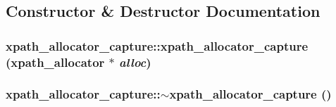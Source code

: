 \subsection{Constructor \& Destructor Documentation}
\hypertarget{structxpath__allocator__capture_af6925e08c811c0cbda74d4da5b9f2eed}{
\subsubsection[{xpath\_\-allocator\_\-capture}]{\setlength{\rightskip}{0pt plus 5cm}xpath\_\-allocator\_\-capture::xpath\_\-allocator\_\-capture ({\bf xpath\_\-allocator} $\ast$ {\em alloc})}}
\label{structxpath__allocator__capture_af6925e08c811c0cbda74d4da5b9f2eed}
\hypertarget{structxpath__allocator__capture_a09d4f62de6a543483b94eec405667101}{
\subsubsection[{$\sim$xpath\_\-allocator\_\-capture}]{\setlength{\rightskip}{0pt plus 5cm}xpath\_\-allocator\_\-capture::$\sim$xpath\_\-allocator\_\-capture ()}}
\label{structxpath__allocator__capture_a09d4f62de6a543483b94eec405667101}


